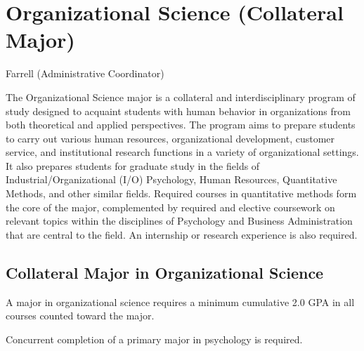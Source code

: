 \documentclass[
  letterpaper,
]{scrbook}
\begin{document}
\section{Organizational Science (Collateral
Major)}\label{sec-organizational-science}

Farrell (Administrative Coordinator)

The Organizational Science major is a collateral and interdisciplinary
program of study designed to acquaint students with human behavior in
organizations from both theoretical and applied perspectives. The
program aims to prepare students to carry out various human resources,
organizational development, customer service, and institutional research
functions in a variety of organizational settings. It also prepares
students for graduate study in the fields of Industrial/Organizational
(I/O) Psychology, Human Resources, Quantitative Methods, and other
similar fields. Required courses in quantitative methods form the core
of the major, complemented by required and elective coursework on
relevant topics within the disciplines of Psychology and Business
Administration that are central to the field. An internship or research
experience is also required.

\subsection{Collateral Major in Organizational
Science}\label{collateral-major-in-organizational-science}

A major in organizational science requires a minimum cumulative 2.0 GPA
in all courses counted toward the major.

Concurrent completion of a primary major in psychology is required.
\end{document}
